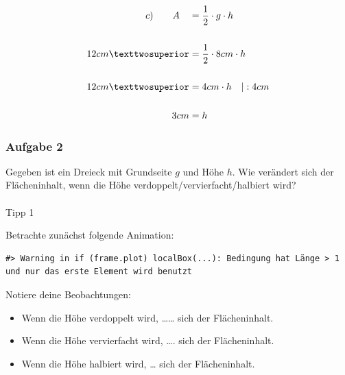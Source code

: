 \documentclass[
  ngerman,
]{book}
\begin{document}
\[ \begin{align} c) \quad\quad A\quad &= {1 \over 2} \cdot g \cdot h \\
{}\\
12 cm² &= {1 \over 2} \cdot 8cm \cdot h\\
{}\\
12 cm² &= 4cm \cdot h \quad |:4cm\\
{}\\
3cm &= h \end{align}\]

\hypertarget{section}{%
\subsubsection*{}\label{section}}

\hypertarget{aufgabe-2-1}{%
\subsubsection*{Aufgabe 2}\label{aufgabe-2-1}}

Gegeben ist ein Dreieck mit Grundseite \(g\) und Höhe \(h\). Wie verändert sich der Flächeninhalt, wenn die Höhe verdoppelt/vervierfacht/halbiert wird?

\hypertarget{section-1}{%
\paragraph*{}\label{section-1}}

Tipp 1

Betrachte zunächst folgende Animation:

\begin{verbatim}
#> Warning in if (frame.plot) localBox(...): Bedingung hat Länge > 1 und nur das erste Element wird benutzt
\end{verbatim}

\begin{center}\end{center}

Notiere deine Beobachtungen:

\begin{itemize}
\item
  Wenn die Höhe verdoppelt wird, \ldots\ldots{} sich der Flächeninhalt.
\item
  Wenn die Höhe vervierfacht wird, \ldots. sich der Flächeninhalt.
\item
  Wenn die Höhe halbiert wird, \ldots{} sich der Flächeninhalt.
\end{itemize}
\end{document}
